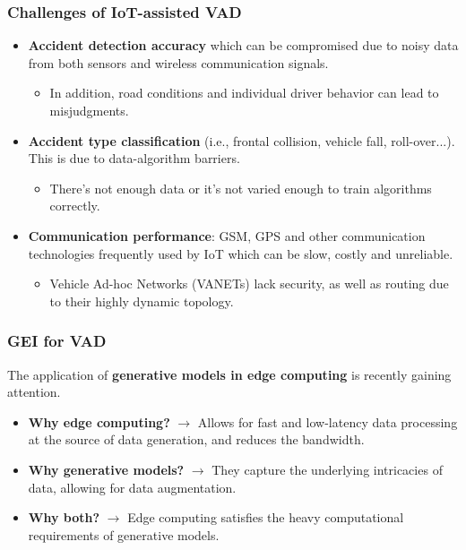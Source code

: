 \documentclass{beamer}
\begin{document}
\begin{frame}
  \frametitle{Challenges of IoT-assisted VAD}
  
  \begin{itemize}
    \item \textbf{Accident detection accuracy} which can be compromised due to noisy data from both sensors 
    and wireless communication signals.
    \begin{itemize}
      \item In addition, road conditions and individual driver behavior can lead to
      misjudgments.
    \end{itemize}
    \item \textbf{Accident type classification} (i.e., frontal collision, vehicle fall, roll-over...). This is
    due to data-algorithm barriers.
    \begin{itemize}
      \item There's not enough data or it's not varied enough to train algorithms correctly.
    \end{itemize}
    \item \textbf{Communication performance}: GSM, GPS and other communication technologies frequently used by IoT 
    which can be slow, costly and unreliable.
    \begin{itemize}
      \item Vehicle Ad-hoc Networks (VANETs) lack security, as well as routing
      due to their highly dynamic topology.
    \end{itemize}

  \end{itemize} 
\end{frame}


\begin{frame}
  \frametitle{GEI for VAD}
  
  The application of \textbf{generative models in edge
  computing} is recently gaining attention.
  
  \begin{itemize}
    \item \textbf{Why edge computing?} $\rightarrow$ Allows for fast and low-latency data processing
    at the source of data generation, and reduces the bandwidth.
    \item \textbf{Why generative models?} $\rightarrow$ They capture the underlying intricacies 
    of data, allowing for data augmentation.
    \item \textbf{Why both?} $\rightarrow$ Edge computing satisfies the heavy computational requirements of generative models.  

  \end{itemize}

\end{frame}
\end{document}
